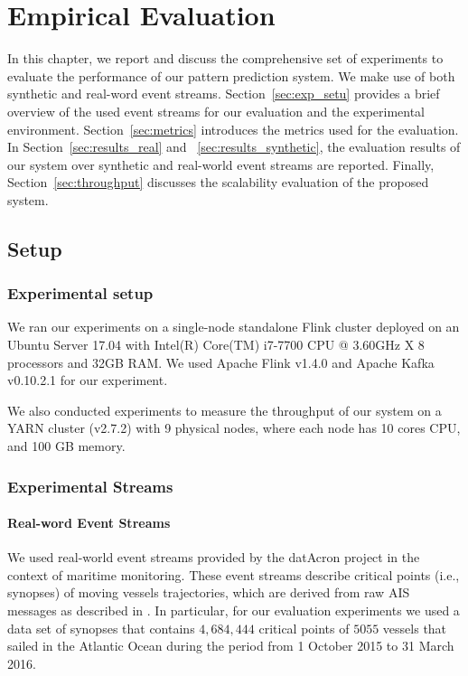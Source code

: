 \chapter{Empirical Evaluation}
\label{chapter:evaluation}

\par In this chapter, we report and discuss the comprehensive set of experiments to evaluate the performance of our pattern prediction system. We make use of both synthetic and real-word event streams. Section~\ref{sec:exp_setu} provides a brief overview of the used event streams for our evaluation and the experimental environment. Section~\ref{sec:metrics} introduces the metrics used for the evaluation. In Section~\ref{sec:results_real} and ~\ref{sec:results_synthetic}, the evaluation results of our system over synthetic and real-world event streams are reported. Finally, Section~\ref{sec:throughput} discusses the scalability evaluation of the proposed system.  

\section{Setup}
\label{sec:setup_data}

\subsection*{Experimental setup}
\label{sec:exp_setu}
\par We ran our experiments on a single-node standalone Flink cluster deployed on an Ubuntu Server 17.04 with Intel(R) Core(TM) i7-7700 CPU @ 3.60GHz X 8 processors and 32GB RAM. We used Apache Flink v1.4.0 and Apache Kafka v0.10.2.1 for our experiment.

\par We also conducted experiments to measure the throughput of our system on a YARN \cite{vavilapalli2013apache} cluster (v2.7.2) with 9 physical nodes, where each node has 10 cores CPU, and 100 GB memory.



\subsection*{Experimental Streams}

\subsubsection*{Real-word Event Streams}
We used real-world event streams provided by the datAcron project in the context of maritime monitoring. These event streams describe critical points (i.e., synopses) of moving vessels trajectories, which are derived from raw AIS messages as described in \cite{synopses1}. In particular, for our evaluation experiments we used a data set of synopses that contains $4,684,444$ critical points of $5055$ vessels that sailed in the Atlantic Ocean during the period from 1 October 2015 to 31 March 2016.

